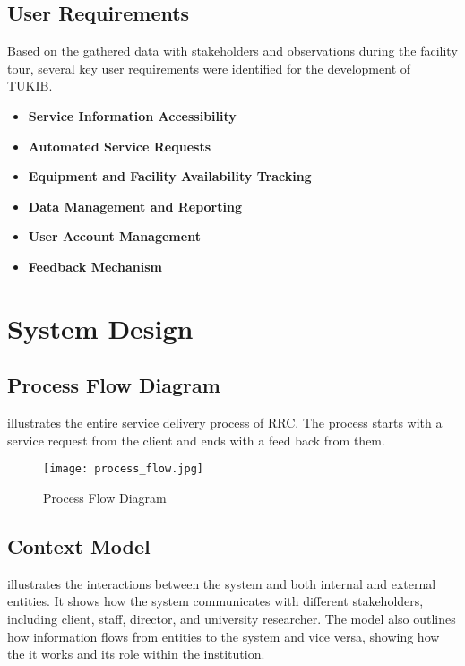 \subsection{User Requirements}

Based on the gathered data with stakeholders and observations during the facility tour, several key user requirements were identified for the development of TUKIB. 

\begin{itemize}
	\item \textbf{Service Information Accessibility}
	\item \textbf{Automated Service Requests}
	\item \textbf{Equipment and Facility Availability Tracking}
	\item \textbf{Data Management and Reporting}
	\item \textbf{User Account Management}
	\item \textbf{Feedback Mechanism}
\end{itemize}

\newpage

\section{System Design}

\subsection{Process Flow Diagram}

 illustrates the entire service delivery process of RRC. The process starts with a service request from the client and ends with a feed back from them.

\begin{figure}[h]
	\centering 
	\texttt{[image: process\_flow.jpg]}
	\caption{Process Flow Diagram}
	\label{fig:process_flow}
\end{figure}

\newpage

\subsection{Context Model}

 illustrates the interactions between the system and both internal and external entities. It shows how the system communicates with different stakeholders, including client, staff, director, and university researcher. The model also outlines how information flows from entities to the system and vice versa, showing how the it works and its role within the institution.

